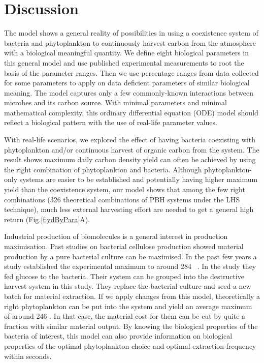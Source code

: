 \documentclass[../thesis.tex]{subfiles} %
\begin{document}
\section{Discussion}
The model shows a general reality of possibilities in using a coexistence system of bacteria and phytoplankton to continuously harvest carbon from the atmosphere with a biological meaningful quantity.  We define eight biological parameters in this general model and use published experimental measurements to root the basis of the parameter ranges.  Then we use percentage ranges from data collected for some parameters to apply on data deficient parameters of similar biological meaning.  The model captures only a few commonly-known interactions between microbes and its carbon source.  With minimal parameters and minimal mathematical complexity, this ordinary differential equation (ODE) model should reflect a biological pattern with the use of real-life parameter values.

With real-life scenarios, we explored the effect of having bacteria coexisting with phytoplankton and/or continuous harvest of organic carbon from the system.  The result shows maximum daily carbon density yield can often be achieved by using the right combination of phytoplankton and bacteria.  Although phytoplankton-only systems are easier to be established and potentially having higher maximum yield than the coexistence system, our model shows that among the few right combinations (326 theoretical combinations of PBH systems under the LHS technique), much less external harvesting effort are needed to get a general high return (Fig.\ref{f:ydByPara}A).

Industrial production of biomolecules is a general interest in production maximisation.  Past studies on bacterial cellulose production showed material production by a pure bacterial culture can be maximised.  In the past few years a study established the experimental maximum to around 284 \dxdt\ \autocite{aytekin2016statistical}.  In the study they fed glucose to the bacteria.  Their system can be grouped into the destructive harvest system in this study.  They replace the bacterial culture and seed a new batch for material extraction.  If we apply changes from this model, theoretically a right phytoplankton can be put into the system and yield an average maximum of around 246 \dxdt.  In that case, the material cost for them can be cut by quite a fraction with similar material output.  By knowing the biological properties of the bacteria of interest, this model can also provide information on biological properties of the optimal phytoplankton choice and optimal extraction frequency within seconds.
\end{document}
